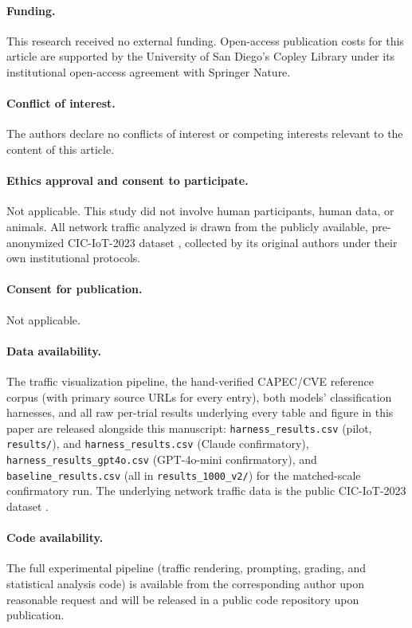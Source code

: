 \documentclass[twocolumn]{svjour3}
\begin{document}
\paragraph{Funding.} This research received no external funding. Open-access publication costs
for this article are supported by the University of San Diego's Copley Library under its
institutional open-access agreement with Springer Nature.

\paragraph{Conflict of interest.} The authors declare no conflicts of interest or competing
interests relevant to the content of this article.

\paragraph{Ethics approval and consent to participate.} Not applicable. This study did not
involve human participants, human data, or animals. All network traffic analyzed is drawn from
the publicly available, pre-anonymized CIC-IoT-2023 dataset \cite{cic-iot-2023}, collected by its
original authors under their own institutional protocols.

\paragraph{Consent for publication.} Not applicable.

\paragraph{Data availability.} The traffic visualization pipeline, the hand-verified CAPEC\slash CVE
reference corpus (with primary source URLs for every entry), both models' classification
harnesses, and all raw per-trial results underlying every table and figure in this paper are
released alongside this manuscript: \texttt{harness\allowbreak\_results.csv} (pilot,
\texttt{results/}), and
\texttt{harness\allowbreak\_results.csv} (Claude confirmatory), \texttt{harness\allowbreak\_results\allowbreak\_gpt4o.csv}
(GPT-4o-mini confirmatory), and \texttt{baseline\allowbreak\_results.csv} (all in
\texttt{results\allowbreak\_1000\allowbreak\_v2/}) for the matched-scale confirmatory run. The underlying network
traffic data is the public CIC-IoT-2023 dataset \cite{cic-iot-2023}.

\paragraph{Code availability.} The full experimental pipeline (traffic rendering, prompting,
grading, and statistical analysis code) is available from the corresponding author upon
reasonable request and will be released in a public code repository upon publication.
\end{document}
